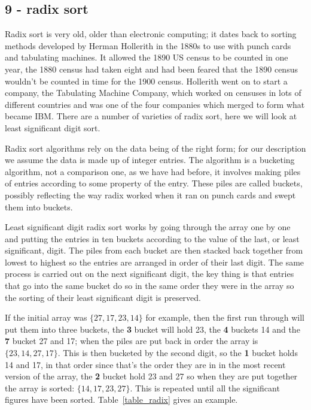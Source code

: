 \documentclass[11pt,a4paper]{scrartcl}
\begin{document}
\subsection*{9 - radix sort}

Radix sort is very old, older than electronic computing; it dates back
to sorting methods developed by Herman Hollerith in the 1880s to use
with punch cards and tabulating machines. It allowed the 1890 US
census to be counted in one year, the 1880 census had taken eight and
had been feared that the 1890 census wouldn't be counted in time for
the 1900 census. Hollerith went on to start a company, the Tabulating
Machine Company, which worked on censuses in lots of different
countries and was one of the four companies which merged to form what
became IBM. There are a number of varieties of radix sort, here we
will look at least significant digit sort.

Radix sort algorithms rely on the data being of the right form; for
our description we assume the data is made up of integer entries. The
algorithm is a bucketing algorithm, not a comparison one, as we have
had before, it involves making piles of entries according to some
property of the entry. These piles are called buckets, possibly
reflecting the way radix worked when it ran on punch cards and swept
them into buckets.

Least significant digit radix sort works by going through the array
one by one and putting the entries in ten buckets according to the
value of the last, or least significant, digit. The piles from each
bucket are then stacked back together from lowest to highest so the
entries are arranged in order of their last digit. The same process is
carried out on the next significant digit, the key thing is that
entries that go into the same bucket do so in the same order they were
in the array so the sorting of their least significant digit is
preserved. 

If the initial array was $\{27,17,23,14\}$ for example, then the first
run through will put them into three buckets, the {\bf 3} bucket will
hold 23, the {\bf 4} buckets 14 and the {\bf 7} bucket 27 and 17; when
the piles are put back in order the array is $\{23,14,27,17\}$. This
is then bucketed by the second digit, so the {\bf 1} bucket holds 14
and 17, in that order since that's the order they are in in the most
recent version of the array, the {\bf 2} bucket hold 23 and 27 so when
they are put together the array is sorted: $\{14,17,23,27\}$. This is
repeated until all the significant figures have been
sorted. Table~\ref{table_radix} gives an example.
\end{document}
